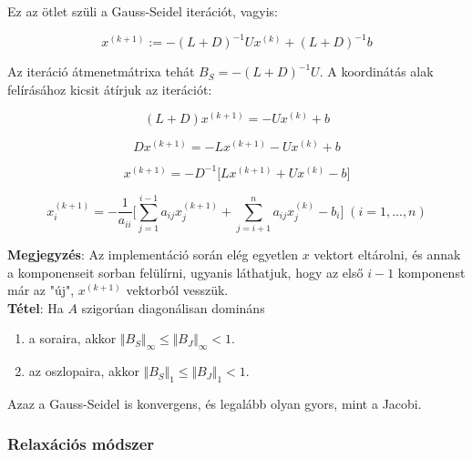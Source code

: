 \documentclass[margin=0px]{article}
\begin{document}
\noindent Ez az ötlet szüli a Gauss-Seidel iterációt, vagyis:

\begin{displaymath}
    x^{(k+1)} :=  -(L+D)^{-1}Ux^{(k)} + (L+D)^{-1}b
\end{displaymath}

Az iteráció átmenetmátrixa tehát $B_{S} = -(L+D)^{-1}U$. A koordinátás alak felírásához kicsit átírjuk
az iterációt:

\begin{displaymath}
    (L+D)x^{(k+1)} = -Ux^{(k)} + b
\end{displaymath}

\begin{displaymath}
    Dx^{(k+1)} = -Lx^{(k+1)} - Ux^{(k)} + b
\end{displaymath}

\begin{displaymath}
    x^{(k+1)} = -D^{-1} \big[Lx^{(k+1)} + Ux^{(k)} - b \big]
\end{displaymath}

\begin{displaymath}
    x^{(k+1)}_{i} =
    -\frac{1}{a_{ii}}
    \Bigg[
    \sum_{j=1}^{i-1} a_{ij}x_{j}^{(k+1)} +
    \sum_{j=i+1}^{n} a_{ij}x_{j}^{(k)}	-
    b_{i}
    \Bigg]
    \; (i = 1, ..., n)
\end{displaymath}

\noindent \textbf{Megjegyzés}: Az implementáció során elég egyetlen $x$ vektort eltárolni, és annak a komponenseit sorban felülírni, ugyanis
láthatjuk, hogy az első $i-1$ komponenst már az "új", $x^{(k+1)}$ vektorból vesszük.\\

\noindent \textbf{Tétel}: Ha $A$ szigorúan diagonálisan domináns
\begin{enumerate}
    \item	a soraira, akkor
          $\Vert B_{S} \Vert_{\infty} \leq \Vert B_{J} \Vert_{\infty} < 1$.

    \item  az oszlopaira, akkor
          $\Vert B_{S} \Vert_{1} \leq \Vert B_{J} \Vert_{1} < 1$.
\end{enumerate}

\noindent Azaz a Gauss-Seidel is konvergens, és legalább olyan gyors, mint a Jacobi.

\subsubsection{Relaxációs módszer}
\end{document}
